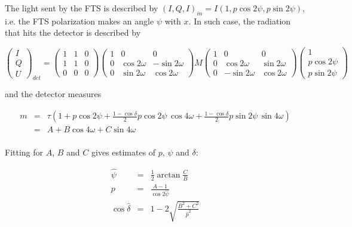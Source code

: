 \documentclass[a4paper,10pt]{article}
\begin{document}
The light sent by the FTS is described by $(I,Q,I)_{in} =
I(1,p\cos2\psi,p\sin2\psi)$, i.e. the FTS polarization makes an angle $\psi$
with $x$. In such case, the radiation that hits the detector is described by

\begin{equation}
\left(\begin{array}{c}
I\\Q\\U\end{array}\right)_{det} = 
\left(\begin{array}{ccc}
1 & 1 & 0 \\
1 & 1 & 0 \\
0 & 0 & 0\end{array}\right)
\left(\begin{array}{rrr}
1 & 0 & 0\\
0 & \cos2\omega & -\sin2\omega \\
0 & \sin2\omega &  \cos2\omega\end{array}\right)
M
\left(\begin{array}{rrr}
1 & 0 & 0\\
0 &  \cos2\omega & \sin2\omega \\
0 & -\sin2\omega & \cos2\omega\end{array}\right)
\left(\begin{array}{r}
1\\p\cos2\psi\\p\sin2\psi\end{array}\right)
\end{equation}

and the detector measures

\begin{eqnarray}
m &=& \tau\left( 1+p\cos2\psi + \frac{1-\cos\delta}{2}p\cos2\psi\,\cos4\omega +
\frac{1-\cos\delta}{2}p\sin2\psi\,\sin4\omega\right)\nonumber\\
&=& A + B\cos4\omega + C\sin4\omega \nonumber\\
\end{eqnarray}

Fitting for $A$, $B$ and $C$ gives estimates of $p$, $\psi$ and $\delta$:

\begin{eqnarray}
\hat{\psi} & = & \frac{1}{2}\arctan\frac{C}{B} \\
p & = & \frac{A-1}{\cos2\hat{\psi}} \\
\cos\hat{\delta} &=& 1-2\sqrt{\frac{B^2+C^2}{\hat{p}^2}}
\end{eqnarray}
\end{document}
